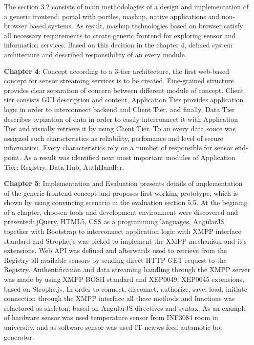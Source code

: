 	The section 3.2 consists of main methodologies of a design and implementation of a generic frontend: portal with portles, mashup, native applications and non-browser based systems. As result, mashup technologies based on browser satisfy all necessary requirements to create generic frontend for exploring sensor and information services. Based on this decision in the chapter 4, defined system architecture and described responsibility of an every module.

    \textbf{Chapter 4}: Concept
    \newline
    according to a 3-tier architecture, the first web-based concept for sensor streaming services is to be created. Fine-grained structure provides clear separation of concern between different module of concept. Client tier consists GUI description and content, Application Tier provides application logic in order to interconnect backend and Client Tier, and finally, Data Tier describes typization of data in order to easily interconnect it with Application Tier and visually retrieve it by using Client Tier. To an every data souce was assigned such characteristics as reliability, perfomance and level of secure information. Every characteristics rely on a number of responsible for sensor end-point. As a result was identified next most important modules of Application Tier: Registry, Data Hub, AuthHandler.

    \textbf{Chapter 5}: Implementation and Evaluation
    \newline
    presents details of implementation of the generic frontend concept and proposes first working prototype, which is shown by using convincing scenario in the evaluation section 5.5. At the begining of a chapter, choosen tools and development environment were discovered and presented: jQuery, HTML5, CSS as a programming languages, AngularJS together with Bootstrap to interconnect application logic with XMPP interface standard and Strophe.js was picked to implement the XMPP mechanism and it's extensions. Web API was defined and afterwards used to retrieve from the Registry all available sensors by sending direct HTTP GET request to the Registry. Authentification and data streaming handling through the XMPP server was made by using XMPP BOSH standard and XEP0049, XEP0045 extensions, based on Strophe.js. In order to connect, disconnet, authorize, save, load, initiate connection through the XMPP interface all these methods and functions was refactored as skeleton, based on AngularJS directives and syntax. As an example of hardware sensor was used temperature sensor from INF3084 room in university, and as software sensor was used IT newws feed autamotic bot generator.

